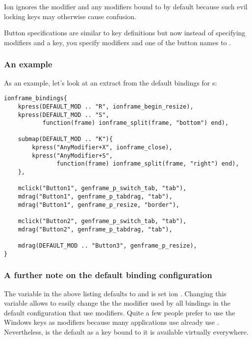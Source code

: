 Ion ignores the  modifier and any  modifiers bound
to 
by default because such evil locking keys may otherwise cause confusion.

Button specifications are similar to key definitions but now
instead of specifying modifiers and a key, you specify modifiers
and one of the button names  to
.


\subsubsection{An example}

As an example, let's look at an extract from the default bindings for
s:

\begin{verbatim}
ionframe_bindings{
    kpress(DEFAULT_MOD .. "R", ionframe_begin_resize),
    kpress(DEFAULT_MOD .. "S",
           function(frame) ionframe_split(frame, "bottom") end),

    submap(DEFAULT_MOD .. "K"){
        kpress("AnyModifier+X", ionframe_close),
        kpress("AnyModifier+S",
               function(frame) ionframe_split(frame, "right") end),
    },
    
    mclick("Button1", genframe_p_switch_tab, "tab"),
    mdrag("Button1", genframe_p_tabdrag, "tab"),
    mdrag("Button1", genframe_p_resize, "border"),
    
    mclick("Button2", genframe_p_switch_tab, "tab"),
    mdrag("Button2", genframe_p_tabdrag, "tab"),
    
    mdrag(DEFAULT_MOD .. "Button3", genframe_p_resize),
}
\end{verbatim}

\subsubsection{A further note on the default binding configuration}

The variable  in the above listing defaults to
 and is set ion . Changing this
variable allows to easily change the the modifier used by all bindings
in the default configuration that use modifiers. Quite a few people
prefer to use the Windows keys as modifiers because many applications
use already use . Nevertheless,  is the default as a
key bound to it is available virtually everywhere.

